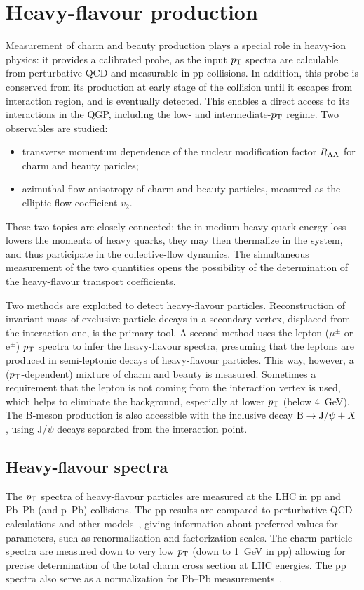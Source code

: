 \section{Heavy-flavour production}
\label{secks:heavy}
 Measurement of charm and beauty production plays a special role in heavy-ion physics: it provides a calibrated probe, as the input $p_{\rm T}$ spectra are calculable from perturbative QCD and measurable in pp collisions. In addition, this probe is conserved from its production at early stage of the collision until it escapes from interaction region, and is eventually detected. This enables a direct access to its interactions in the QGP, including the low- and intermediate-$p_{\rm T}$ regime. Two observables are studied:
 \begin{itemize}
 \item{transverse momentum dependence of the nuclear modification factor $R_{\rm AA}$ for charm and beauty paricles;}
 \item{azimuthal-flow anisotropy of charm and beauty particles, measured as the elliptic-flow coefficient $v_2$.}
 \end{itemize}
 These two topics are closely connected: the in-medium heavy-quark energy loss lowers the momenta of heavy quarks, they may then thermalize in the system, and thus participate in the collective-flow dynamics. The simultaneous measurement of the two quantities opens the possibility of the determination of the heavy-flavour transport coefficients.

 Two methods are exploited to detect heavy-flavour particles. Reconstruction of invariant mass of exclusive particle decays in a secondary vertex, displaced from the interaction one, is the primary tool. A second method uses the lepton ($\mu^\pm$ or e$^\pm$) $p_{\rm T}$ spectra to infer the heavy-flavour spectra, presuming that the leptons are produced in semi-leptonic decays of heavy-flavour particles. This way, however, a ($p_{\rm T}$-dependent) mixture of charm and beauty is measured. Sometimes a requirement that the lepton is not coming from the interaction vertex is used, which helps to eliminate the background, especially at lower $p_{\rm T}$ (below 4~GeV). The B-meson production is also accessible with the inclusive decay ${\rm B} \rightarrow {\rm J}/\psi + X$, using J/$\psi$ decays separated from the interaction point.
\subsection{Heavy-flavour spectra}
\label{subsecks:heavyspectra}
The $p_{\rm T}$ spectra of heavy-flavour particles are measured at the LHC in pp and Pb--Pb (and p--Pb) collisions. The pp results are compared to perturbative QCD calculations and other models~\cite{ALICE:2011aa,Abelev:2012vra}, giving information about preferred values for parameters, such as renormalization and factorization scales. The charm-particle spectra are measured down to very low $p_{\rm T}$ (down to 1~GeV in pp) allowing for precise determination of the total charm cross section at LHC energies. The pp spectra also serve as a normalization for Pb--Pb measurements~\cite{ALICE:2012ab}.

